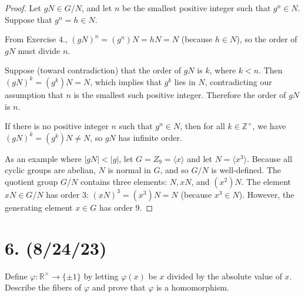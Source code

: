 \documentclass{article}
\begin{document}
\begin{proof}
    Let $gN \in G/N$, and let $n$ be the smallest positive integer such that $g^n \in N$. Suppose that $g^n = h \in N$.

    From Exercise 4., $(gN)^n = (g^n)N = hN = N$ (because $h \in N$), so the order of $gN$ must divide $n$.

    Suppose (toward contradiction) that the order of $gN$ is $k$, where $k < n$. Then $(gN)^k = (g^k)N = N$, which implies that $g^k$ lies in $N$, contradicting our assumption that $n$ is the smallest such positive integer. Therefore the order of $gN$ is $n$.

    If there is no positive integer $n$ such that $g^n \in N$, then for all $k \in \mathbb{Z}^+$, we have $(gN)^k = (g^k)N \neq N$, so $gN$ has infinite order.

    As an example where $|gN| < |g|$, let $G = Z_9 = \langle x \rangle$ and let $N = \langle x^3 \rangle$. Because all cyclic groups are abelian, $N$ is normal in $G$, and so $G/N$ is well-defined. The quotient group $G/N$ contains three elements: $N, xN$, and $(x^2)N$. The element $xN \in G/N$ has order 3: $(xN)^3 = (x^3)N = N$ (because $x^3 \in N$). However, the generating element $x \in G$ has order 9.
\end{proof}

\section*{6. (8/24/23)}

Define $\varphi: \mathbb{R}^\times \rightarrow \{ \pm 1 \}$ by letting $\varphi(x)$ be $x$ divided by the absolute value of $x$. Describe the fibers of $\varphi$ and prove that $\varphi$ is a homomorphism.
\end{document}
